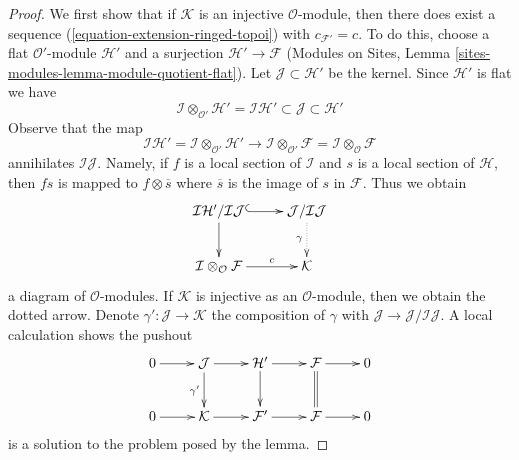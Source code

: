 \begin{proof}
We first show that if $\mathcal{K}$ is an injective $\mathcal{O}$-module,
then there does exist a sequence (\ref{equation-extension-ringed-topoi}) with
$c_{\mathcal{F}'} = c$. To do this, choose a flat
$\mathcal{O}'$-module $\mathcal{H}'$ and a surjection
$\mathcal{H}' \to \mathcal{F}$
(Modules on Sites, Lemma \ref{sites-modules-lemma-module-quotient-flat}).
Let $\mathcal{J} \subset \mathcal{H}'$ be the kernel. Since $\mathcal{H}'$
is flat we have
$$
\mathcal{I} \otimes_{\mathcal{O}'} \mathcal{H}' =
\mathcal{I}\mathcal{H}'
\subset \mathcal{J} \subset \mathcal{H}'
$$
Observe that the map
$$
\mathcal{I}\mathcal{H}' =
\mathcal{I} \otimes_{\mathcal{O}'} \mathcal{H}'
\longrightarrow
\mathcal{I} \otimes_{\mathcal{O}'} \mathcal{F} =
\mathcal{I} \otimes_\mathcal{O} \mathcal{F}
$$
annihilates $\mathcal{I}\mathcal{J}$. Namely, if $f$ is a local section
of $\mathcal{I}$ and $s$ is a local section of $\mathcal{H}$, then
$fs$ is mapped to $f \otimes \overline{s}$ where $\overline{s}$ is
the image of $s$ in $\mathcal{F}$. Thus we obtain
$$
\xymatrix{
\mathcal{I}\mathcal{H}'/\mathcal{I}\mathcal{J}
\ar@{^{(}->}[r] \ar[d] &
\mathcal{J}/\mathcal{I}\mathcal{J} \ar@{..>}[d]_\gamma \\
\mathcal{I} \otimes_\mathcal{O} \mathcal{F} \ar[r]^-c &
\mathcal{K}
}
$$
a diagram of $\mathcal{O}$-modules. If $\mathcal{K}$ is injective
as an $\mathcal{O}$-module, then we obtain the dotted arrow.
Denote $\gamma' : \mathcal{J} \to \mathcal{K}$ the composition
of $\gamma$ with $\mathcal{J} \to \mathcal{J}/\mathcal{I}\mathcal{J}$.
A local calculation shows the pushout
$$
\xymatrix{
0 \ar[r] &
\mathcal{J} \ar[r] \ar[d]_{\gamma'} &
\mathcal{H}' \ar[r] \ar[d] &
\mathcal{F} \ar[r] \ar@{=}[d] &
0 \\
0 \ar[r] &
\mathcal{K} \ar[r] &
\mathcal{F}' \ar[r] &
\mathcal{F} \ar[r] &
0
}
$$
is a solution to the problem posed by the lemma.


\end{proof}
